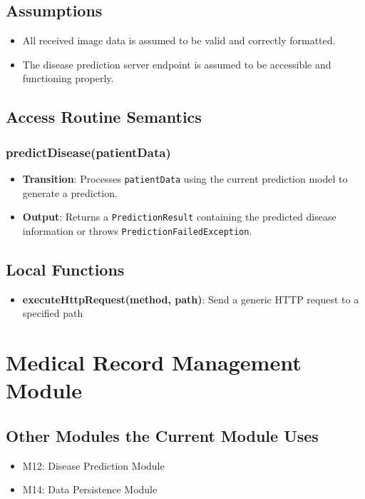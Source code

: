\documentclass[12pt, titlepage]{article}
\begin{document}
\subsection{Assumptions}
\begin{itemize}
    \item All received image data is assumed to be valid and correctly formatted.
    \item The disease prediction server endpoint is assumed to be accessible and functioning properly.
\end{itemize}

\subsection{Access Routine Semantics}
\subsubsection{predictDisease(patientData)}
\begin{itemize}
    \item \textbf{Transition}: Processes \texttt{patientData} using the current prediction model to generate a prediction.
    \item \textbf{Output}: Returns a \texttt{PredictionResult} containing the predicted disease information or throws \texttt{PredictionFailedException}.
\end{itemize}

\subsection{Local Functions}
\begin{itemize}
\item \textbf{executeHttpRequest(method, path)}: Send a generic HTTP request to a specified
path
\end{itemize}

\newpage
\section{Medical Record Management Module}

\subsection{Other Modules the Current Module Uses}
\begin{itemize}
  \item M12: Disease Prediction Module
  \item M14: Data Persistence Module
\end{itemize}
\end{document}
